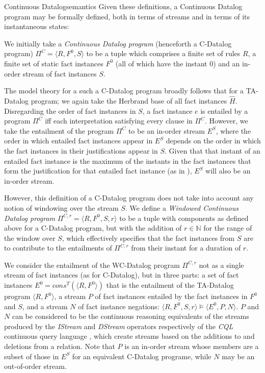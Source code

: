 \begin{nestedsection}{Continuous Datalog}{semantics}
Given these definitions, a Continuous Datalog program may be formally
defined, both in terms of streams and in terms of its instantaneous
states:

\begin{definition}

We initially take a {\em Continuous Datalog program} (henceforth a
C-Datalog program) $\Pi^C = \langle R, F^0, S \rangle$ to be a tuple
which comprises a finite set of rules $R$, a finite set of static fact
instances $F^0$ (all of which have the instant $0$) and an in-order
stream of fact instances $S$.

The model theory for a such a C-Datalog program broadly follows that
for a TA-Datalog program; we again take the Herbrand base of all fact
instances $\hat{H}$. Disregarding the order of fact instances in $S$,
a fact instance $e$ is entailed by a program $\Pi^C$ iff each
interpretation satisfying every clause in $\Pi^C$. However, we take
the entailment of the program $\Pi^C$ to be an in-order stream $E^S$,
where the order in which entailed fact instances appear in $E^S$
depends on the order in which the fact instances in their
justifications appear in $S$. Given that that instant of an entailed
fact instance is the maximum of the instants in the fact instances
that form the justification for that entailed fact instance (as in
), $E^S$ will also
be an in-order stream.

However, this definition of a C-Datalog program does not take into
account any notion of windowing over the stream $S$. We define a {\em
  Windowed Continuous Datalog program} $\Pi^{C, r} = \langle R, F^0, S,
r \rangle$ to be a tuple with components as defined above for a
C-Datalog program, but with the addition of $r \in \mathbb{N}$ for the
range of the window over $S$, which effectively specifies that the
fact instances from $S$ are to contribute to the entailments of $\Pi^{C,r}$
from their instant for a duration of $r$.

We consider the entailment of the WC-Datalog program $\Pi^{C,r}$ not
as a single stream of fact instances (as for C-Datalog), but in three
parts: a set of fact instances $E^0 = cons^T(\langle R, F^0\rangle)$
that is the entailment of the TA-Datalog program $\langle R,
F^0\rangle$, a stream $P$ of fact instances entailed by the fact
instances in $F^0$ and $S$, and a stream $N$ of fact instance
negations: $\langle R, F^0, S, r \rangle \models \langle E^0, P, N
\rangle$. $P$ and $N$ can be considered to be the continuous reasoning
equivalents of the streams produced by the \emph{IStream} and
\emph{DStream} operators respectively of the \emph{CQL} continuous
query language \citep{CQL}, which create streams based on the
additions to and deletions from a relation. Note that $P$ is an
in-order stream whose members are a subset of those in $E^S$ for an
equivalent C-Datalog programe, while $N$ may be an out-of-order
stream.
\end{definition}


\end{nestedsection}
